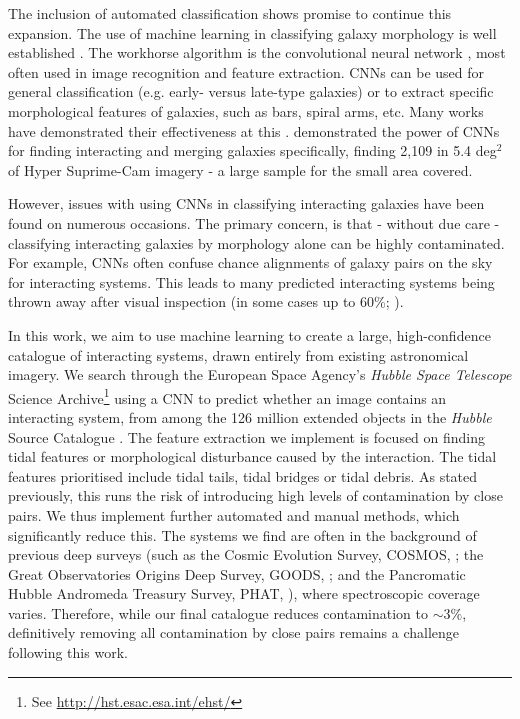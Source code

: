 The inclusion of automated classification shows promise to continue this expansion. The use of machine learning in classifying galaxy morphology is well established \citep{1996VA.....40..401A, 2017NatSR...7.4463A, 2020A&C....3000334B, 2020ApJ...895..112G, 2021MNRAS.503.4446C}. The workhorse algorithm is the convolutional neural network \citep[CNN; for an introduction, see][]{2015arXiv151108458O}, most often used in image recognition and feature extraction. CNNs can be used for general classification (e.g. early- versus late-type galaxies) or to extract specific morphological features of galaxies, such as bars, spiral arms, etc. Many works have demonstrated their effectiveness at this \citep[e.g.][]{2018MNRAS.479..415A, 2019ApJS..243...17J, 2021MNRAS.504..372B, 2021arXiv211101154B, 2022MNRAS.509.3966W}. \citet{2022A&A...661A..52P} demonstrated the power of CNNs for finding interacting and merging galaxies specifically, finding 2,109 in 5.4 deg$^2$ of Hyper Suprime-Cam imagery - a large sample for the small area covered.

However, issues with using CNNs in classifying interacting galaxies have been found on numerous occasions. The primary concern, is that - without due care - classifying interacting galaxies by morphology alone can be highly contaminated. For example, CNNs often confuse chance alignments of galaxy pairs on the sky for interacting systems. This leads to many predicted interacting systems being thrown away after visual inspection (in some cases up to 60\%; \citet{2019MNRAS.490.5390B, 2022A&A...661A..52P}). 

In this work, we aim to use machine learning to create a large, high-confidence catalogue of interacting systems, drawn entirely from existing astronomical imagery. We search through the European Space Agency's \emph{Hubble Space Telescope} Science Archive\footnote{See \url{http://hst.esac.esa.int/ehst/}} using a CNN to predict whether an image contains an interacting system, from among the 126 million extended objects in the \emph{Hubble} Source Catalogue \citep[HSC;][]{2016AJ....151..134W}. The feature extraction we implement is focused on finding tidal features or morphological disturbance caused by the interaction. The tidal features prioritised include tidal tails, tidal bridges or tidal debris. As stated previously, this runs the risk of introducing high levels of contamination by close pairs. We thus implement further automated and manual methods, which significantly reduce this. The systems we find are often in the background of previous deep surveys (such as the Cosmic Evolution Survey, COSMOS, \citealt{2007ApJS..172....1S}; the Great Observatories Origins Deep Survey, GOODS, \citealt{2004ApJ...600L..93G}; and the Pancromatic Hubble Andromeda Treasury Survey, PHAT, \citealt{2012ApJS..200...18D}), where spectroscopic coverage varies. Therefore, while our final catalogue reduces contamination to $\sim 3\%$, definitively removing all contamination by close pairs remains a challenge following this work.

